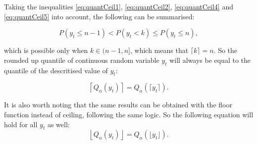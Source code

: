 \documentclass[]{elsarticle} %
\begin{document}
Taking the inequalities \eqref{eq:quantCeil1}, \eqref{eq:quantCeil2}, \eqref{eq:quantCeil4} and \eqref{eq:quantCeil5} into account, the following can be summarised:

\begin{equation} \label{eq:quantCeil6}
    P \left(y_t \leq n-1 \right) < P \left(y_t < k \right) \leq P \left(y_t \leq n \right) ,
\end{equation}

which is possible only when \(k \in (n-1, n]\), which means that \(\lceil k \rceil = n\). So the rounded up quantile of continuous random variable \(y_t\) will always be equal to the quantile of the descritised value of \(y_t\):

\begin{equation} \label{eq:ceilingAndQuantiles1}
    \left \lceil Q_\alpha(y_t) \right \rceil = Q_\alpha \left(\lceil y_t \rceil \right) .
\end{equation}

It is also worth noting that the same results can be obtained with the floor function instead of ceiling, following the same logic. So the following equation will hold for all \(y_t\) as well:
\begin{equation} \label{eq:floorAndQuantiles1}
    \left \lfloor Q_\alpha(y_t) \right \rfloor = Q_\alpha \left(\lfloor y_t \rfloor \right) .
\end{equation}

\renewcommand\refname{References}

\end{document}
